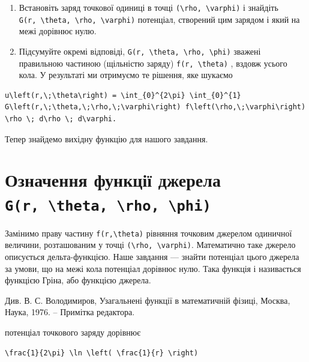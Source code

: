 \documentclass[
  ukrainian,
]{article}
\begin{document}
\begin{enumerate}
\def\labelenumi{\arabic{enumi}.}
\item
  Встановіть заряд точкової одиниці в точці
  \texttt{(\textbackslash{}rho,\ \textbackslash{}varphi)} і знайдіть
  \texttt{G(r,\ \textbackslash{}theta,\ \textbackslash{}rho,\ \textbackslash{}varphi)}
  потенціал, створений цим зарядом і який на межі дорівнює нулю.
\item
  Підсумуйте окремі відповіді,
  \texttt{G(r,\ \textbackslash{}theta,\ \textbackslash{}rho,\ \textbackslash{}phi)}
  зважені правильною частиною (щільністю заряду)
  \texttt{f(r,\ \textbackslash{}theta)} , вздовж усього кола. У
  результаті ми отримуємо те рішення, яке шукаємо
\end{enumerate}

\begin{verbatim}
u\left(r,\;\theta\right) = \int_{0}^{2\pi} \int_{0}^{1} G\left(r,\;\theta,\;\rho,\;\varphi\right) f\left(\rho,\;\varphi\right) \rho \; d\rho \; d\varphi.
\end{verbatim}

Тепер знайдемо вихідну функцію для нашого завдання.

\section{\texorpdfstring{Означення функції джерела
\texttt{G(r,\ \textbackslash{}theta,\ \textbackslash{}rho,\ \textbackslash{}phi)}}{Означення функції джерела G(r, \textbackslash theta, \textbackslash rho, \textbackslash phi)}}\label{ux43eux437ux43dux430ux447ux435ux43dux43dux44f-ux444ux443ux43dux43aux446ux456ux457-ux434ux436ux435ux440ux435ux43bux430-gr-theta-rho-phi}

Замінимо праву частину \texttt{f(r,\textbackslash{}theta)} рівняння
точковим джерелом одиничної величини, розташованим у точці
\texttt{(\textbackslash{}rho,\ \textbackslash{}varphi)}. Математично
таке джерело описується дельта-функцією. Наше завдання --- знайти
потенціал цього джерела за умови, що на межі кола потенціал дорівнює
нулю. Така функція і називається функцією Гріна, або функцією джерела.

Див. В. С. Володимиров, Узагальнені функції в математичній фізиці,
Москва, Наука, 1976. -- Примітка редактора.

потенціал точкового заряду дорівнює

\begin{verbatim}
\frac{1}{2\pi} \ln \left( \frac{1}{r} \right)
\end{verbatim}
\end{document}
